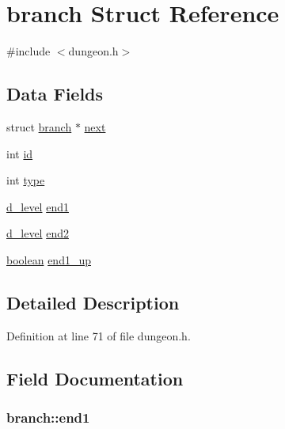 \hypertarget{structbranch}{\section{branch Struct Reference}
\label{structbranch}
}


{\ttfamily \#include $<$dungeon.\+h$>$}

\subsection*{Data Fields}
\begin{DoxyCompactItemize}
\item 
struct \hyperlink{structbranch}{branch} $\ast$ \hyperlink{structbranch_a2d875e643e7793fda05ce9ae5ccf92a6}{next}
\item 
int \hyperlink{structbranch_a1cb5491cdb47419b84edc85bbf178d33}{id}
\item 
int \hyperlink{structbranch_ada8b57edb359f2fa43429fc63662b385}{type}
\item 
\hyperlink{structd__level}{d\+\_\+level} \hyperlink{structbranch_a6be8b97f73577e49aed4266f80cd50a7}{end1}
\item 
\hyperlink{structd__level}{d\+\_\+level} \hyperlink{structbranch_ae943c130ab49b7d1281034ce23e84977}{end2}
\item 
\hyperlink{global_8h_a531b10dd351aa162d7dcccd1966308b8}{boolean} \hyperlink{structbranch_aa468bd347d9b729f8a5da2e6096c4f20}{end1\+\_\+up}
\end{DoxyCompactItemize}


\subsection{Detailed Description}


Definition at line 71 of file dungeon.\+h.



\subsection{Field Documentation}
\hypertarget{structbranch_a6be8b97f73577e49aed4266f80cd50a7}{
\subsubsection[{end1}]{ branch\+::end1}}\label{structbranch_a6be8b97f73577e49aed4266f80cd50a7}


